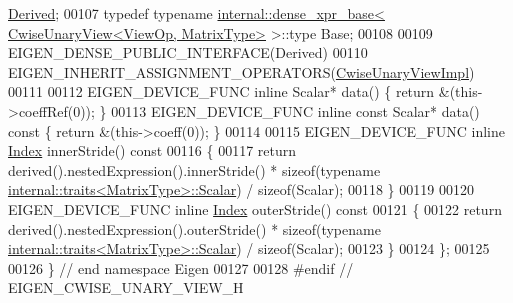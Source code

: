\begin{DoxyCode}
      \hyperlink{group___core___module_class_eigen_1_1_cwise_unary_view}{Derived};
00107     \textcolor{keyword}{typedef} \textcolor{keyword}{typename} 
      \hyperlink{struct_eigen_1_1internal_1_1dense__xpr__base}{internal::dense\_xpr\_base< CwiseUnaryView<ViewOp, MatrixType>}
       >::type Base;
00108 
00109     EIGEN\_DENSE\_PUBLIC\_INTERFACE(Derived)
00110     EIGEN\_INHERIT\_ASSIGNMENT\_OPERATORS(\hyperlink{class_eigen_1_1_cwise_unary_view_impl}{CwiseUnaryViewImpl})
00111     
00112     EIGEN\_DEVICE\_FUNC \textcolor{keyword}{inline} Scalar* data() \{ \textcolor{keywordflow}{return} &(this->coeffRef(0)); \}
00113     EIGEN\_DEVICE\_FUNC \textcolor{keyword}{inline} \textcolor{keyword}{const} Scalar* data()\textcolor{keyword}{ const }\{ \textcolor{keywordflow}{return} &(this->coeff(0)); \}
00114 
00115     EIGEN\_DEVICE\_FUNC \textcolor{keyword}{inline} \hyperlink{namespace_eigen_a62e77e0933482dafde8fe197d9a2cfde}{Index} innerStride()\textcolor{keyword}{ const}
00116 \textcolor{keyword}{    }\{
00117       \textcolor{keywordflow}{return} derived().nestedExpression().innerStride() * \textcolor{keyword}{sizeof}(\textcolor{keyword}{typename} 
      \hyperlink{struct_eigen_1_1internal_1_1traits}{internal::traits<MatrixType>::Scalar}) / \textcolor{keyword}{sizeof}(Scalar);
00118     \}
00119 
00120     EIGEN\_DEVICE\_FUNC \textcolor{keyword}{inline} \hyperlink{namespace_eigen_a62e77e0933482dafde8fe197d9a2cfde}{Index} outerStride()\textcolor{keyword}{ const}
00121 \textcolor{keyword}{    }\{
00122       \textcolor{keywordflow}{return} derived().nestedExpression().outerStride() * \textcolor{keyword}{sizeof}(\textcolor{keyword}{typename} 
      \hyperlink{struct_eigen_1_1internal_1_1traits}{internal::traits<MatrixType>::Scalar}) / \textcolor{keyword}{sizeof}(Scalar);
00123     \}
00124 \};
00125 
00126 \} \textcolor{comment}{// end namespace Eigen}
00127 
00128 \textcolor{preprocessor}{#endif // EIGEN\_CWISE\_UNARY\_VIEW\_H}
\end{DoxyCode}
